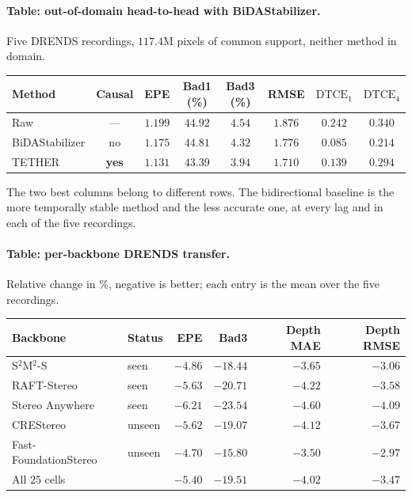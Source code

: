 \documentclass[letterpaper,10pt,conference]{ieeeconf}
\begin{document}
\paragraph{Table: out-of-domain head-to-head with BiDAStabilizer.}
Five DRENDS recordings, $117.4$M pixels of common support, neither method in
domain.

\begin{center}
\begin{tabular}{lccccccc}
\toprule
Method & Causal & EPE & Bad1 (\%) & Bad3 (\%) & RMSE & $\mathrm{DTCE}_1$ & $\mathrm{DTCE}_4$ \\
\midrule
Raw            & ---          & $1.199$ & $44.92$ & $4.54$ & $1.876$ & $0.242$ & $0.340$ \\
BiDAStabilizer & no           & $1.175$ & $44.81$ & $4.32$ & $1.776$ & $\mathbf{0.085}$ & $\mathbf{0.214}$ \\
TETHER         & \textbf{yes} & $\mathbf{1.131}$ & $\mathbf{43.39}$ & $\mathbf{3.94}$ & $\mathbf{1.710}$ & $0.139$ & $0.294$ \\
\bottomrule
\end{tabular}
\end{center}

The two best columns belong to different rows. The bidirectional baseline is
the more temporally stable method and the less accurate one, at every lag and
in each of the five recordings.

\paragraph{Table: per-backbone DRENDS transfer.}
Relative change in \%, negative is better; each entry is the mean over the
five recordings.

\begin{center}
\begin{tabular}{llrrrr}
\toprule
Backbone & Status & EPE & Bad3 & Depth MAE & Depth RMSE \\
\midrule
S$^2$M$^2$-S          & seen   & $-4.86$ & $-18.44$ & $-3.65$ & $-3.06$ \\
RAFT-Stereo           & seen   & $-5.63$ & $-20.71$ & $-4.22$ & $-3.58$ \\
Stereo Anywhere       & seen   & $-6.21$ & $-23.54$ & $-4.60$ & $-4.09$ \\
CREStereo             & unseen & $-5.62$ & $-19.07$ & $-4.12$ & $-3.67$ \\
Fast-FoundationStereo & unseen & $-4.70$ & $-15.80$ & $-3.50$ & $-2.97$ \\
\midrule
All $25$ cells        &        & $-5.40$ & $-19.51$ & $-4.02$ & $-3.47$ \\
\bottomrule
\end{tabular}
\end{center}
\end{document}
